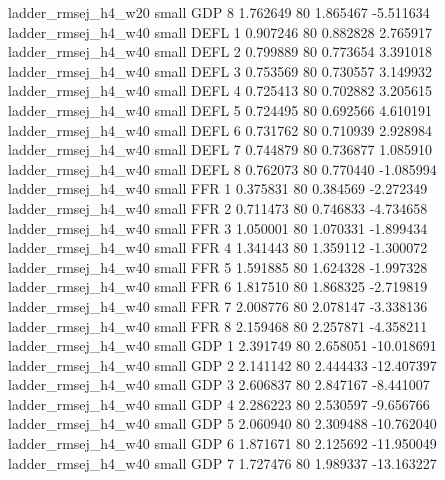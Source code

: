      ladder_rmsej_h4_w20      small      GDP                 8 1.762649 80       1.865467          -5.511634
     ladder_rmsej_h4_w40      small     DEFL                 1 0.907246 80       0.882828           2.765917
     ladder_rmsej_h4_w40      small     DEFL                 2 0.799889 80       0.773654           3.391018
     ladder_rmsej_h4_w40      small     DEFL                 3 0.753569 80       0.730557           3.149932
     ladder_rmsej_h4_w40      small     DEFL                 4 0.725413 80       0.702882           3.205615
     ladder_rmsej_h4_w40      small     DEFL                 5 0.724495 80       0.692566           4.610191
     ladder_rmsej_h4_w40      small     DEFL                 6 0.731762 80       0.710939           2.928984
     ladder_rmsej_h4_w40      small     DEFL                 7 0.744879 80       0.736877           1.085910
     ladder_rmsej_h4_w40      small     DEFL                 8 0.762073 80       0.770440          -1.085994
     ladder_rmsej_h4_w40      small      FFR                 1 0.375831 80       0.384569          -2.272349
     ladder_rmsej_h4_w40      small      FFR                 2 0.711473 80       0.746833          -4.734658
     ladder_rmsej_h4_w40      small      FFR                 3 1.050001 80       1.070331          -1.899434
     ladder_rmsej_h4_w40      small      FFR                 4 1.341443 80       1.359112          -1.300072
     ladder_rmsej_h4_w40      small      FFR                 5 1.591885 80       1.624328          -1.997328
     ladder_rmsej_h4_w40      small      FFR                 6 1.817510 80       1.868325          -2.719819
     ladder_rmsej_h4_w40      small      FFR                 7 2.008776 80       2.078147          -3.338136
     ladder_rmsej_h4_w40      small      FFR                 8 2.159468 80       2.257871          -4.358211
     ladder_rmsej_h4_w40      small      GDP                 1 2.391749 80       2.658051         -10.018691
     ladder_rmsej_h4_w40      small      GDP                 2 2.141142 80       2.444433         -12.407397
     ladder_rmsej_h4_w40      small      GDP                 3 2.606837 80       2.847167          -8.441007
     ladder_rmsej_h4_w40      small      GDP                 4 2.286223 80       2.530597          -9.656766
     ladder_rmsej_h4_w40      small      GDP                 5 2.060940 80       2.309488         -10.762040
     ladder_rmsej_h4_w40      small      GDP                 6 1.871671 80       2.125692         -11.950049
     ladder_rmsej_h4_w40      small      GDP                 7 1.727476 80       1.989337         -13.163227
